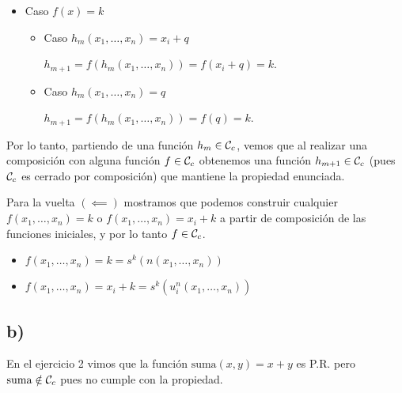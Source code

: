 \begin{itemize}
    \item Caso $f(x) = k$

    \begin{itemize}
        \item Caso $h_m(x_1, \dots, x_n) = x_i + q$

        $h_{m+1} = f(h_m(x_1, \dots, x_n)) = f(x_i + q) = k$.

        \item Caso $h_m(x_1, \dots, x_n) = q$

        $h_{m+1} = f(h_m(x_1, \dots, x_n)) = f(q) = k$.
    \end{itemize}
\end{itemize}

Por lo tanto, partiendo de una función $h_m \in \mathcal{C}_c$, vemos que al realizar una composición con alguna función $f \in \mathcal{C}_c$ obtenemos una función $h_{m+1} \in \mathcal{C}_c$ (pues $\mathcal{C}_c$ es cerrado por composición) que mantiene la propiedad enunciada.

Para la vuelta $(\impliedby)$ mostramos que podemos construir cualquier $f(x_1, \dots, x_n) = k$ o $f(x_1, \dots, x_n) = x_i + k$ a partir de composición de las funciones iniciales, y por lo tanto $f \in \mathcal{C}_c$.

\begin{itemize}
    \item $f(x_1, \dots, x_n) = k = s^k(n(x_1, \dots, x_n))$
    \item $f(x_1, \dots, x_n) = x_i + k = s^k(u^n_i(x_1, \dots, x_n))$
\end{itemize}

\subsection*{b)}

En el ejercicio 2 vimos que la función $\text{suma}(x, y) = x + y$ es P.R. pero $\text{suma} \notin \mathcal{C}_c$ pues no cumple con la propiedad.
